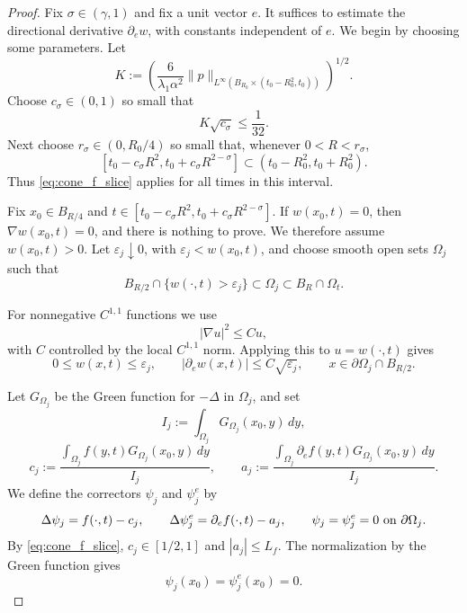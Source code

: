 \documentclass[11pt]{amsart}
\numberwithin{equation}{section}
\numberwithin{figure}{section}
\theoremstyle{plain}
\theoremstyle{definition}
\theoremstyle{remark}
\theoremstyle{plain}
\begin{document}
\begin{proof}
Fix \(\sigma\in(\gamma,1)\) and fix a unit vector \(e\). It suffices to estimate the directional derivative $\partial_e w$, with constants independent of \(e\). We begin by choosing some parameters. Let
\[
    K:=
    \left(\frac{6}{\lambda_1\alpha^2}
    \|p\|_{L^\infty(B_{R_0}\times(t_0-R_0^2,t_0))}
    \right)^{1/2}.
\]
Choose \(c_\sigma\in(0,1)\) so small that
\begin{equation}\label{eq:cone_csigma_choice}
    K\sqrt{c_\sigma}\leq \frac1{32}.
\end{equation} Next choose \(r_\sigma\in(0,R_0/4)\) so small that, whenever
\(0<R<r_\sigma\),
\[
    [t_0-c_\sigma R^2,t_0+c_\sigma R^{2-\sigma}]
    \subset (t_0-R_0^2,t_0+R_0^2).
\]
Thus \eqref{eq:cone_f_slice} applies for all times in this interval.


Fix \(x_0\in B_{R/4}\) and \(t\in[t_0-c_\sigma R^2,t_0+c_\sigma R^{2-\sigma}]\). If
\(w(x_0,t)=0\), then \(\nabla w(x_0,t)=0\), and there is nothing to prove. We therefore assume
\(w(x_0,t)>0\). Let \(\varepsilon_j\downarrow0\), with
\(\varepsilon_j<w(x_0,t)\), and choose smooth open sets $\Omega_j$ such that 
\begin{equation}\label{eq:cone_Omega_j}
    B_{R/2}\cap\{w(\cdot,t)>\varepsilon_j\}\subset\Omega_j
    \subset B_R\cap\Omega_t.
\end{equation}

For nonnegative \(C^{1,1}\) functions we use
\begin{equation}\label{eq:cone_c11_sqrt}
    |\nabla u|^2\leq C u,
\end{equation}
with \(C\) controlled by the local \(C^{1,1}\) norm. Applying this to
\(u=w(\cdot,t)\) gives
\begin{equation}\label{eq:cone_inner_boundary_smallness}
    0\leq w(x,t)\leq\varepsilon_j,
    \qquad
    |\partial_e w(x,t)|\leq C\sqrt{\varepsilon_j},
    \qquad x\in\partial\Omega_j\cap B_{R/2}.
\end{equation}

Let \(G_{\Omega_j}\) be the Green function for \(-\Delta\) in \(\Omega_j\), and
set
\[
    I_j:=\int_{\Omega_j}G_{\Omega_j}(x_0,y)\,dy,
\]
\[
    c_j:=
    \frac{\int_{\Omega_j}f(y,t)G_{\Omega_j}(x_0,y)\,dy}{I_j},
    \qquad
    a_j:=
    \frac{\int_{\Omega_j}\partial_e f(y,t)G_{\Omega_j}(x_0,y)\,dy}{I_j}.
\]
We define the correctors \(\psi_j\) and \(\psi_j^e\) by
\[
    \Delta\psi_j=f(\cdot,t)-c_j,
    \qquad
    \Delta\psi_j^e=\partial_e f(\cdot,t)-a_j,
    \qquad
    \psi_j=\psi_j^e=0\hbox{ on }\partial\Omega_j.
\]
By \eqref{eq:cone_f_slice}, \(c_j\in[1/2,1]\) and \(|a_j|\leq L_f\).  The
normalization by the Green function gives
\begin{equation}\label{eq:cone_corrector_center}
    \psi_j(x_0)=\psi_j^e(x_0)=0.
\end{equation}


\end{proof}
\end{document}
